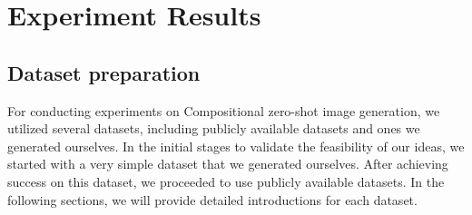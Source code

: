 \chapter{Experiment Results}
\label{chapter:experiments}

\section{Dataset preparation}
\label{sec:dataset}
For conducting experiments on Compositional zero-shot image generation, we utilized several datasets, including publicly available datasets and ones we generated ourselves. In the initial stages to validate the feasibility of our ideas, we started with a very simple dataset that we generated ourselves. After achieving success on this dataset, we proceeded to use publicly available datasets. In the following sections, we will provide detailed introductions for each dataset.


